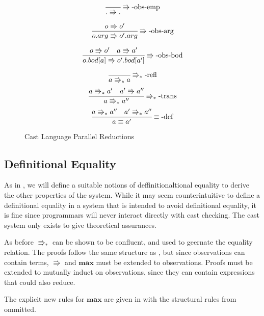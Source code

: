 \begin{figure}
\[
\frac{\,}{.\Rrightarrow.}
\operatorname{\Rrightarrow-obs-emp}
\]

\[
\frac{o\Rrightarrow o'}{o.arg\Rrightarrow o'.arg}
\operatorname{\Rrightarrow-obs-arg}
\]

\[
\frac{o\Rrightarrow o'\quad a\Rrightarrow a'}{o.bod[a]\Rrightarrow o'.bod[a']}
\operatorname{\Rrightarrow-obs-bod}
\]

\[
\frac{\,}{a\Rrightarrow_{\ast}a}
\operatorname{\Rrightarrow_{\ast}-refl}
\]
\[
\frac{a\Rrightarrow_{\ast}a'\quad a'\Rrightarrow a''}{a\Rrightarrow_{\ast}a''}
\operatorname{\Rrightarrow_{\ast}-trans}
\]
\[
\frac{a\Rrightarrow_{\ast}a''\quad a'\Rrightarrow_{\ast}a''}{a\equiv a'}
\operatorname{\equiv-def}
\]

\caption{Cast Language Parallel Reductions}
\label{fig:cast-reduction}
\end{figure}

\subsection{Definitional Equality}

As in , we will define a suitable notions of deffinitionaltional equality to derive the other properties of the system.
While it may seem counterintuitive to define a definitional equality in a system that is intended to avoid definitional equality, it is fine since programmars will never interact directly with cast checking.
The cast system only exists to give theoretical assurances.

As before $\Rrightarrow_{*}$ can be shown to be confluent, and used to geernate the equality relation.
The proofs follow the same structure as , but since observations can contain terms, $\Rrightarrow$ and $\textbf{max}$ must be extended to observations.
Proofs must be extended to mutually induct on observations, since they can contain expressions that could also reduce.

The explicit new rules for $\textbf{max}$  are given in  with the structural rules from  ommitted.


